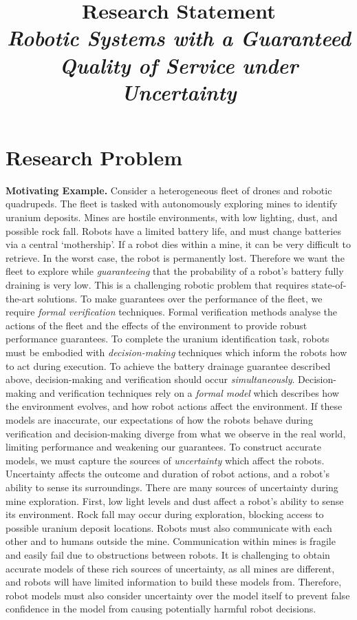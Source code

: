 \documentclass[12pt]{article}
\title{Research Statement\\ \large \emph{Robotic Systems with a Guaranteed Quality of Service under Uncertainty}}
\date{}
\author{}
\begin{document}
\maketitle
\thispagestyle{empty}

\section*{Research Problem}

\vspace*{1ex}\noindent\textbf{Motivating Example.} Consider a heterogeneous fleet of drones and robotic quadrupeds.
%
The fleet is tasked with autonomously exploring mines to identify uranium deposits.
%
Mines are hostile environments, with low lighting, dust, and possible rock fall.
%
Robots have a limited battery life, and must change batteries via a central `mothership'.
%
If a robot dies within a mine, it can be very difficult to retrieve.
%
In the worst case, the robot is permanently lost.
%
Therefore we want the fleet to explore while \emph{guaranteeing} that the probability of a robot's battery fully draining is very low.
%
This is a challenging robotic problem that requires state-of-the-art solutions.
%
To make guarantees over the performance of the fleet, we require \emph{formal verification} techniques.
%
Formal verification methods analyse the actions of the fleet and the effects of the environment to provide robust performance guarantees.
%
To complete the uranium identification task, robots must be embodied with \emph{decision-making} techniques which inform the robots how to act during execution.
%
To achieve the battery drainage guarantee described above, decision-making and verification should occur \emph{simultaneously}.
%
Decision-making and verification techniques rely on a \emph{formal model} which describes how the environment evolves, and how robot actions affect the environment.
%
If these models are inaccurate, our expectations of how the robots behave during verification and decision-making diverge from what we observe in the real world, limiting performance and weakening our guarantees. 
%
To construct accurate models, we must capture the sources of \emph{uncertainty} which affect the robots.
%
Uncertainty affects the outcome and duration of robot actions, and a robot's ability to sense its surroundings.
%
There are many sources of uncertainty during mine exploration.
%
First, low light levels and dust affect a robot's ability to sense its environment.
%
Rock fall may occur during exploration, blocking access to possible uranium deposit locations.
%
Robots must also communicate with each other and to humans outside the mine.
%
Communication within mines is fragile and easily fail due to obstructions between robots.
%
It is challenging to obtain accurate models of these rich sources of uncertainty, as all mines are different, and robots will have limited information to build these models from.
%
Therefore, robot models must also consider uncertainty over the model itself to prevent false confidence in the model from causing potentially harmful robot decisions.
\end{document}

